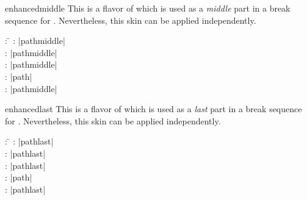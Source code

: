 \medskip

\begin{docSkin}{enhancedmiddle}
This is a flavor of  which is used as a \emph{middle} part
in a break sequence for .
Nevertheless, this skin can be applied independently.
\begin{tcolorbox}[skintable=enhancedmiddle]
  \begin{tabbing}
    : \=\kill
    :           \> |pathmiddle|\\
    : \> |pathmiddle|\\ 
    :        \> |pathmiddle|\\
    :    \> |path|\\
    :           \> |pathmiddle|
  \end{tabbing}
\end{tcolorbox}
\end{docSkin}


\begin{dispExample}
\end{dispExample}


\clearpage
\begin{docSkin}{enhancedlast}
This is a flavor of  which is used as a \emph{last} part
in a break sequence for .
Nevertheless, this skin can be applied independently.
\begin{tcolorbox}[skintable=enhancedlast]
  \begin{tabbing}
    : \=\kill
    :           \> |pathlast|\\
    : \> |pathlast|\\ 
    :        \> |pathlast|\\
    :    \> |path|\\
    :           \> |pathlast|
  \end{tabbing}
\end{tcolorbox}
\end{docSkin}

\begin{dispExample}
\end{dispExample}

